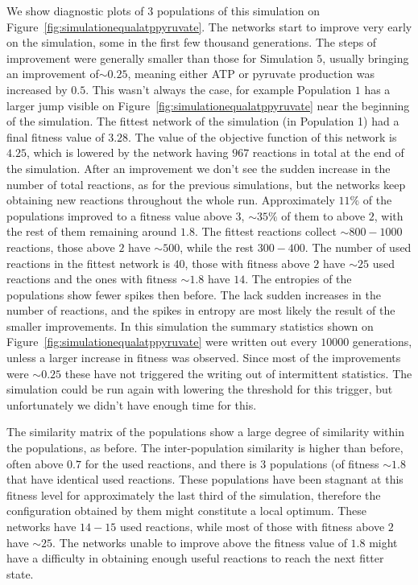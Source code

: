 \documentclass[a4paper,12pt]{article}
\begin{document}
We show diagnostic plots of $3$ populations of this simulation on Figure~\ref{fig:simulationequalatppyruvate}. The networks start to improve very early on the simulation, some in the first few thousand generations. The steps of improvement were generally smaller than those for Simulation $5$, usually bringing an improvement of$\sim 0.25$, meaning either ATP or pyruvate production was increased by $0.5$. This wasn't always the case, for example Population $1$ has a larger jump visible on Figure~\ref{fig:simulationequalatppyruvate} near the beginning of the simulation. The fittest network of the simulation (in Population 1) had a final fitness value of $3.28$. The value of the objective function of this network is $4.25$, which is lowered by the network having $967$ reactions in total at the end of the simulation. After an improvement we don't see the sudden increase in the number of total reactions, as for the previous simulations, but the networks keep obtaining new reactions throughout the whole run. Approximately $11\%$ of the populations improved to a fitness value above $3$, $\sim 35\%$ of them to above $2$, with the rest of them remaining around $1.8$. The fittest reactions collect $\sim 800-1000$ reactions, those above $2$ have $\sim 500$, while the rest $300-400$. The number of used reactions in the fittest network is $40$, those with fitness above $2$ have $\sim 25$ used reactions and the ones with fitness $\sim1.8$ have $14$. The entropies of the populations show fewer spikes then before. The lack sudden increases in the number of reactions, and the spikes in entropy are most likely the result of the smaller improvements. In this simulation the summary statistics shown on Figure~\ref{fig:simulationequalatppyruvate} were written out every $10000$ generations, unless a larger increase in fitness was observed. Since most of the improvements were $\sim 0.25$ these have not triggered the writing out of intermittent statistics. The simulation could be run again with lowering the threshold for this trigger, but unfortunately we didn't have enough time for this. 

The similarity matrix of the populations show a large degree of similarity within the populations, as before. The inter-population similarity is higher than before, often above $0.7$ for the used reactions, and there is $3$ populations (of fitness $\sim 1.8$ that have identical used reactions. These populations have been stagnant at this fitness level for approximately the last third of the simulation, therefore the configuration obtained by them might constitute a local optimum. These networks have $14-15$ used reactions, while most of those with fitness above $2$ have $\sim 25$. The networks unable to improve above the fitness value of $1.8$ might have a difficulty in obtaining enough useful reactions to reach the next fitter state. 
\end{document}
